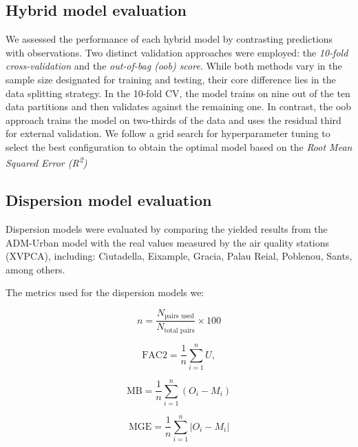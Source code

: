 \documentclass{article}
\begin{document}
\subsection{Hybrid model evaluation}
We assessed the performance of each hybrid model by contrasting predictions with observations. Two distinct validation approaches were employed: the \textit{10-fold cross-validation} and the \textit{out-of-bag (oob) score}. While both methods vary in the sample size designated for training and testing, their core difference lies in the data splitting strategy. In the 10-fold CV, the model trains on nine out of the ten data partitions and then validates against the remaining one. In contrast, the oob approach trains the model on two-thirds of the data and uses the residual third for external validation. We follow a grid search for hyperparameter tuning  to select the best configuration to obtain the optimal model based on the \textit{Root Mean Squared Error (R\textsuperscript{2})}

\subsection{Dispersion model evaluation}
Dispersion models were evaluated by comparing the yielded results from the ADM-Urban model with the real values measured by the air quality stations (XVPCA), including: Ciutadella, Eixample, Gracia, Palau Reial, Poblenou, Sants, among others.\vspace{0.5cm}

The metrics used for the dispersion models we:

\begin{equation}
n = \frac{N_{\text{pairs used}}}{N_{\text{total pairs}}} \times 100
\end{equation}

\begin{equation}
\text{FAC2} = \frac{1}{n} \sum_{i=1}^{n} U,
\end{equation}

\begin{equation}
\text{MB} = \frac{1}{n} \sum_{i=1}^{n} (O_i - M_i)
\end{equation}

\begin{equation}
\text{MGE} = \frac{1}{n} \sum_{i=1}^{n} |O_i - M_i|
\end{equation}
\end{document}
